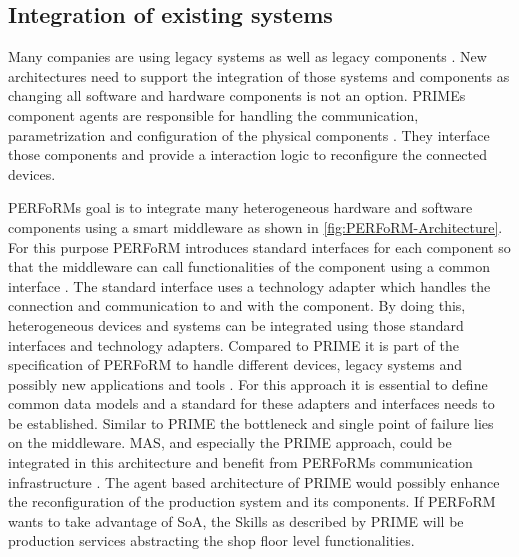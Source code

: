 \documentclass[conference,compsoc,hidelinks]{IEEEtran}
\begin{document}
\subsection{Integration of existing systems}
Many companies are using legacy systems as well as legacy components \cite{HarmonizedSystems}. New architectures need to support the integration of those systems and components as changing all software and hardware components is not an option. PRIMEs component agents are responsible for handling the communication, parametrization and configuration of the physical components \cite{Hybrid}. They interface those components and provide a interaction logic to reconfigure the connected devices. 

PERFoRMs goal is to integrate many heterogeneous hardware and software components using a smart middleware as shown in \autoref{fig:PERFoRM-Architecture}. For this purpose PERFoRM introduces standard interfaces for each component so that the middleware can call functionalities of the component using a common interface \cite{SpecPERFoRM}. The standard interface uses a technology adapter which handles the connection and communication to and with the component. By doing this, heterogeneous devices and systems can be integrated using those standard interfaces and technology adapters. Compared to PRIME it is part of the specification of PERFoRM to handle different devices, legacy systems and possibly new applications and tools \cite{SpecPERFoRM,HarmonizedSystems}. For this approach it is essential to define common data models and a standard for these adapters and interfaces needs to be established. Similar to PRIME the bottleneck and single point of failure lies on the middleware. MAS, and especially the PRIME approach, could be integrated in this architecture and benefit from PERFoRMs communication infrastructure \cite{Peres2017}. The agent based architecture of PRIME would possibly enhance the reconfiguration of the production system and its components. If PERFoRM wants to take advantage of SoA, the Skills as described by PRIME will be production services abstracting the shop floor level functionalities. 
\end{document}
